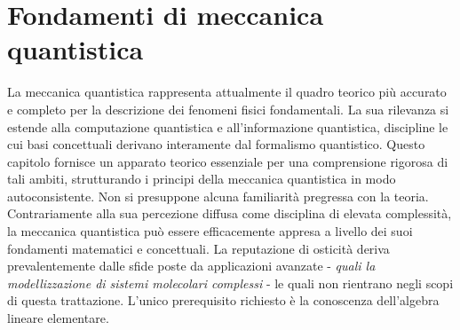 \documentclass[a4paper,12pt]{report}
\theoremstyle{plain}
\begin{document}
\chapter{Fondamenti di meccanica quantistica}
La meccanica quantistica rappresenta attualmente il quadro teorico più accurato e completo per la descrizione dei fenomeni fisici fondamentali. La sua rilevanza si estende alla computazione quantistica e all'informazione quantistica, discipline le cui basi concettuali derivano interamente dal formalismo quantistico. Questo capitolo fornisce un apparato teorico essenziale per una comprensione rigorosa di tali ambiti, strutturando i principi della meccanica quantistica in modo autoconsistente. Non si presuppone alcuna familiarità pregressa con la teoria.
Contrariamente alla sua percezione diffusa come disciplina di elevata complessità, la meccanica quantistica può essere efficacemente appresa a livello dei suoi fondamenti matematici e concettuali. La reputazione di osticità deriva prevalentemente dalle sfide poste da applicazioni avanzate - \textit{quali la modellizzazione di sistemi molecolari complessi} - le quali non rientrano negli scopi di questa trattazione. L'unico prerequisito richiesto è la conoscenza dell'algebra lineare elementare.
\end{document}
